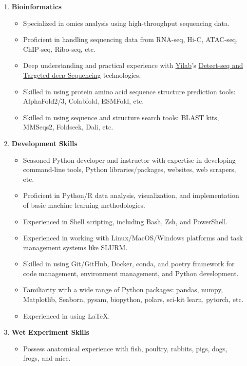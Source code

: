 \begin{enumerate}
    \item \textbf{Bioinformatics}
    \begin{itemize}
        \item Specialized in omics analysis using high-throughput sequencing data.
        \item Proficient in handling sequencing data from RNA-seq, Hi-C, ATAC-seq, ChIP-seq, Ribo-seq, etc.
        \item Deep understanding and practical experience with \href{https://yilab.org.cn/}{Yilab}'s \href{https://www.nature.com/articles/s41586-022-04836-5}{Detect-seq and Targeted deep Sequencing} technologies.
        \item Skilled in using protein amino acid sequence structure prediction tools: AlphaFold2/3, Colabfold, ESMFold, etc.
        \item Skilled in using sequence and structure search tools: BLAST kits, MMSeqs2, Foldseek, Dali, etc.
    \end{itemize}
    \item \textbf{Development Skills}
    \begin{itemize}
        \item Seasoned Python developer and instructor with expertise in developing 
        command-line tools, Python libraries/packages, websites, web scrapers, etc.
        \item Proficient in Python/R data analysis, visualization, and implementation of basic machine learning methodologies.
        \item Experienced in Shell scripting, including Bash, Zsh, and PowerShell.
        \item Experienced in working with Linux/MacOS/Windows platforms and task management systems like SLURM.
        \item Skilled in using Git/GitHub, Docker, conda, and poetry framework for code management, environment management, and Python development.
        \item Familiarity with a wide range of Python packages: pandas, numpy, Matplotlib, Seaborn, pysam, biopython, polars, sci-kit learn, pytorch, etc.
        \item Experienced in using \LaTeX.
    \end{itemize}
    \item \textbf{Wet Experiment Skills}
    \begin{itemize}
        \item Possess anatomical experience with fish, poultry, rabbits, pigs, dogs, frogs, and mice.

\end{itemize}
\end{enumerate}
